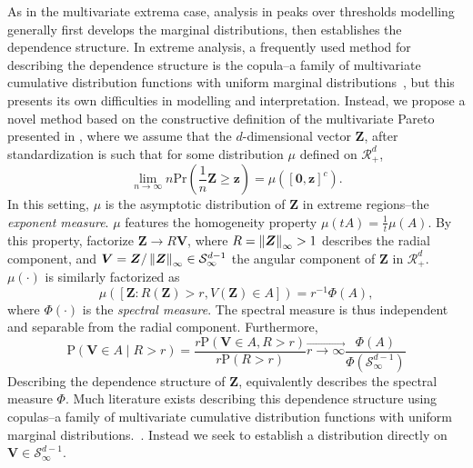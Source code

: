 As in the multivariate extrema case, analysis in peaks over thresholds modelling generally first
  develops the marginal distributions, then establishes the dependence structure.  In extreme analysis,
  a frequently used method for describing the dependence structure is the copula--a family of
  multivariate cumulative distribution functions with uniform marginal distributions~\cite{renard2007,deng2011,falk2019},
  but this presents its own difficulties in modelling and interpretation.  Instead, we propose a novel
  method based on the constructive definition of the multivariate Pareto presented in
  \cite{ferreira2014}, where we assume that the $d$-dimensional vector $\bm{Z}$, after standardization
  is such that for some distribution $\mu$ defined on $\mathcal{R}_+^d$,
  \begin{equation}
    \lim\limits_{n\to\infty}n\text{Pr}\left(\frac{1}{n}\bm{Z}\geq \bm{z}\right) = \mu\left([\bm{0},\bm{z}]^c\right).
  \end{equation}
  In this setting, $\mu$ is the asymptotic distribution of $\bm{Z}$ in extreme regions--the
  \emph{exponent measure}.  $\mu$ features the homogeneity property $\mu(tA) = \frac{1}{t}\mu(A)$.
  By this property, \cite{ferreira2014} factorize $\bm{Z}\to R\bm{V}$, where
  $R = \left\lVert \bm{Z} \right\rVert_{\infty} > 1$ describes the radial component, and
  $\bm{V} = \bm{Z}/\left\lVert \bm{Z} \right\rVert_{\infty} \in \mathcal{S}_{\infty}^{d-1}$ the angular component of
  $\bm{Z}$ in $\mathcal{R}_+^d$.  $\mu(\cdot)$ is similarly factorized as
  \begin{equation}
    \mu\left( [\bm{Z} : R(\bm{Z}) > r, V(\bm{Z}) \in A ] \right) = r^{-1}\Phi(A),
  \end{equation}
  where $\Phi(\cdot)$ is the \emph{spectral measure}.  The spectral measure is thus independent and
  separable from the radial component.  Furthermore,
  \begin{equation}
    \text{P}\left(\bm{V} \in A \mid R > r\right)
      = \frac{r\text{P}\left(\bm{V} \in A, R > r\right)}{r\text{P}(R > r)}
      \stackrel{\longrightarrow}{r\to\infty} \frac{\Phi(A)}{\Phi(\mathcal{S}_{\infty}^{d-1})}
  \end{equation}
  Describing the dependence structure of $\bm{Z}$, equivalently describes the spectral measure
  $\Phi$.  Much literature exists describing this dependence structure using copulas--a family of
  multivariate cumulative distribution functions with uniform marginal distributions.~\cite{renard2007,falk2019}.
  Instead we seek to establish a distribution directly on $\bm{V} \in \mathcal{S}_{\infty}^{d-1}$.

